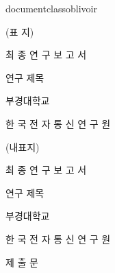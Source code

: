 documentclass{oblivoir}
        
    \usepackage{graphicx}%

    \usepackage{tabu}

    \usepackage{multirow} 

    \usepackage{enumitem}
    \usepackage{dhucs-enumitem} %

    \usepackage{syntonly}
    \usepackage{etoolbox}
    \usepackage{url}
    
\makeatletter
    \newcommand*{\compress}{\@minipagetrue}
    \newcommand{\spec}{
    \begin{itemize}
        \item OS : windows 10 / 64bit
        \item CPU : gtx 1060 6GB
        \item GPU : i7 - 7700
        \item RAM : 16GB
    \end{itemize}
    }
    \makeatother




\tableofcontents
\newpage

\listoffigures
\newpage

\listoftables
\newpage

(표  지)

최 종 연 구 보 고 서

연구 제목

부경대학교

한 국 전 자 통 신 연 구 원

(내표지)

최 종 연 구 보 고 서

연구 제목

부경대학교

한 국 전 자 통 신 연 구 원

제     출     문

